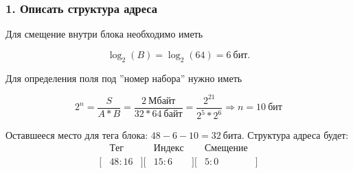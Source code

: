 
\subsubsection*{1. Описать структура адреса}

Для смещение внутри блока необходимо иметь

$$\log_2(B) = \log_2(64) = 6~бит.$$

Для определения поля под ''номер набора'' нужно иметь

$$2^n = \frac{S}{A * B} = \frac{2~Мбайт}{32*64~байт} = \frac{2^21}{2^5*2^6} \Rightarrow n = 10~бит$$

Оставшееся место для тега блока: $48 - 6 - 10 = 32~бита$. Структура адреса будет:
\[
\begin{matrix}
  &Тег&&Индекс&&Смещение& \\
  [&48:16&][&15:6&][&5:0&]
\end{matrix}
\]